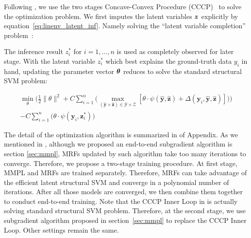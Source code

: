 

Following , we use the two stages Concave-Convex
Procedure (CCCP)~\cite{yuille2002concave} to solve the
optimization problem. We first
imputes the latent variables ${\bm{z}}$ explicitly by
equation~\eqref{eq:linenv_latent_inf}. Namely solving the
``latent variable completion'' problem~\cite{yu2009learning}:


The inference result $z_i^*$ for $i=1,\dots,n$ is used as
completely observed for later stage. With the latent variable
$z_i^*$ which best explains the ground-truth data $y_i$ in hand,
updating the parameter vector ${\bm{\theta}}$ reduces to solve the
standard structural SVM problem:

\begin{align}
\label{eq:mrflssvm_object}
  \min_\theta\bigg(\frac{1}{2}\|\theta\|^2+
  C\sum_{i=1}^{n}\big(\max_{(\mathbf{\hat{y}} \times
  \mathbf{\hat{z}}) \in \mathcal{Y} \times \mathcal{Z}}
  [\theta\cdot\psi(\mathbf{\hat{y}},\mathbf{\hat{z}}) +
  \Delta(\mathbf{y}_i,\mathbf{\hat{y}},\mathbf{\hat{z}})]\big)\bigg)\\
  -C\sum_{i=1}^{n}\big(\theta \cdot
  \psi(\mathbf{y}_i,\mathbf{z}_i^*)\big) \nonumber
\end{align}

The detail of the optimization algorithm is summarized in
 of Appendix. As we mentioned in
, although we proposed an end-to-end
subgradient algorithm is section \ref{sec:mmpl}, MRFs updated by
such algorithm take too many iterations to converge. Therefore,
we propose a two-stage training procedure. At first stage, MMPL
and MRFs are trained separately. Therefore, MRFs can take
advantage of the efficient latent structural SVM and converge in
a polynomial number of iterations. After all those models are
converged, we then combine them together to conduct end-to-end
training. Note that the CCCP Inner Loop in 
is actually solving standard structural SVM problem. Therefore,
at the second stage, we use subgradient algorithm proposed in
section~\ref{sec:mmpl} to replace the CCCP Inner Loop. Other
settings remain the same.

